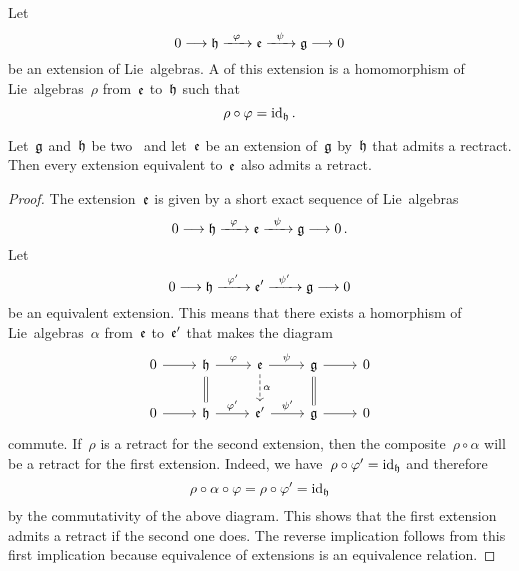 \begin{definition}
	Let
	\[
		0
		\to
		\hlie
		\xto{\varphi}
		\elie
		\xto{\psi}
		\glie
		\to
		0
	\]
	be an extension of Lie~algebras.
	A  of this extension is a homomorphism of Lie~algebras~$\rho$ from~$\mathfrak{e}$ to~$\mathfrak{h}$ such that
	\[
		\rho \circ \varphi
		=
		\mathrm{id}_{\mathfrak{h}} \,.
	\]
\end{definition}


\begin{lemma}
	\label{having a retract is invariant under equivalence of extensions}
	Let~$\mathfrak{g}$ and~$\mathfrak{h}$ be two~\liealgebras{$\kf$} and let~$\mathfrak{e}$ be an extension of~$\mathfrak{g}$ by~$\mathfrak{h}$ that admits a rectract.
	Then every extension equivalent to~$\mathfrak{e}$ also admits a retract.
\end{lemma}


\begin{proof}
	The extension~$\mathfrak{e}$ is given by a short exact sequence of Lie~algebras
	\[
		0
		\to
		\hlie
		\xto{\varphi}
		\elie
		\xto{\psi}
		\glie
		\to
		0 \,.
	\]
	Let
	\[
		0
		\to
		\hlie
		\xto{\varphi'}
		\elie'
		\xto{\psi'}
		\glie
		\to
		0
	\]
	be an equivalent extension.
	This means that there exists a homorphism of Lie~algebras~$\alpha$ from~$\mathfrak{e}$ to~$\mathfrak{e}'$ that makes the diagram
	\[
		\begin{tikzcd}
			0
			\arrow{r}
			&
			\hlie
			\arrow{r}[above]{\varphi}
			\arrow[equal]{d}
			&
			\elie
			\arrow{r}[above]{\psi}
			\arrow[dashed]{d}[right]{\alpha}
			&
			\glie
			\arrow{r}
			\arrow[equal]{d}
			&
			0
			\\
			0
			\arrow{r}
			&
			\hlie
			\arrow{r}[above]{\varphi'}
			&
			\elie'
			\arrow{r}[above]{\psi'}
			&
			\glie
			\arrow{r}
			&
			0
		\end{tikzcd}
	\]
	commute.
	If~$\rho$ is a retract for the second extension, then the composite~$\rho \circ \alpha$ will be a retract for the first extension.
	Indeed, we have~$\rho \circ \varphi' = \mathrm{id}_{\mathfrak{h}}$ and therefore
	\[
		\rho \circ \alpha \circ \varphi
		=
		\rho \circ \varphi'
		=
		\mathrm{id}_{\mathfrak{h}}
	\]
	by the commutativity of the above diagram.
	This shows that the first extension admits a retract if the second one does.
	The reverse implication follows from this first implication because equivalence of extensions is an equivalence relation.
\end{proof}



